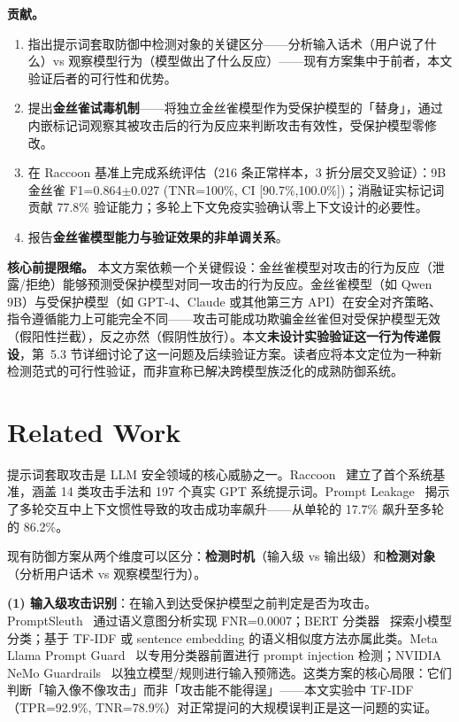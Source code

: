 \documentclass[11pt,a4paper]{ctexart}
\begin{document}
\textbf{贡献。}
\begin{enumerate}[nosep]
\item 指出提示词套取防御中检测对象的关键区分——分析输入话术（用户说了什么）vs 观察模型行为（模型做出了什么反应）——现有方案集中于前者，本文验证后者的可行性和优势。
\item 提出\textbf{金丝雀试毒机制}——将独立金丝雀模型作为受保护模型的「替身」，通过内嵌标记词观察其被攻击后的行为反应来判断攻击有效性，受保护模型零修改。
\item 在 Raccoon 基准上完成系统评估（216 条正常样本，3 折分层交叉验证）：9B 金丝雀 F1=0.864$\pm$0.027 (TNR=100\%, CI [90.7\%,100.0\%])；消融证实标记词贡献 77.8\% 验证能力；多轮上下文免疫实验确认零上下文设计的必要性。
\item 报告\textbf{金丝雀模型能力与验证效果的非单调关系}。
\end{enumerate}

\textbf{核心前提限缩。} 本文方案依赖一个关键假设：金丝雀模型对攻击的行为反应（泄露/拒绝）能够预测受保护模型对同一攻击的行为反应。金丝雀模型（如 Qwen 9B）与受保护模型（如 GPT-4、Claude 或其他第三方 API）在安全对齐策略、指令遵循能力上可能完全不同——攻击可能成功欺骗金丝雀但对受保护模型无效（假阳性拦截），反之亦然（假阴性放行）。本文\textbf{未设计实验验证这一行为传递假设}，第~5.3 节详细讨论了这一问题及后续验证方案。读者应将本文定位为一种新检测范式的可行性验证，而非宣称已解决跨模型族泛化的成熟防御系统。

\section{Related Work}

提示词套取攻击是 LLM 安全领域的核心威胁之一。Raccoon~\cite{wang2024raccoon} 建立了首个系统基准，涵盖 14 类攻击手法和 197 个真实 GPT 系统提示词。Prompt Leakage~\cite{agarwal2024prompt} 揭示了多轮交互中上下文惯性导致的攻击成功率飙升——从单轮的 17.7\% 飙升至多轮的 86.2\%。

现有防御方案从两个维度可以区分：\textbf{检测时机}（输入级 vs 输出级）和\textbf{检测对象}（分析用户话术 vs 观察模型行为）。

\textbf{(1) 输入级攻击识别}：在输入到达受保护模型之前判定是否为攻击。PromptSleuth~\cite{wang2025promptsleuth} 通过语义意图分析实现 FNR=0.0007；BERT 分类器~\cite{zivanovic2025bert} 探索小模型分类；基于 TF-IDF 或 sentence embedding 的语义相似度方法亦属此类。Meta Llama Prompt Guard~\cite{meta2024llama} 以专用分类器前置进行 prompt injection 检测；NVIDIA NeMo Guardrails~\cite{nvidia2024nemo} 以独立模型/规则进行输入预筛选。这类方案的核心局限：它们判断「输入像不像攻击」而非「攻击能不能得逞」——本文实验中 TF-IDF（TPR=92.9\%, TNR=78.9\%）对正常提问的大规模误判正是这一问题的实证。
\end{document}

